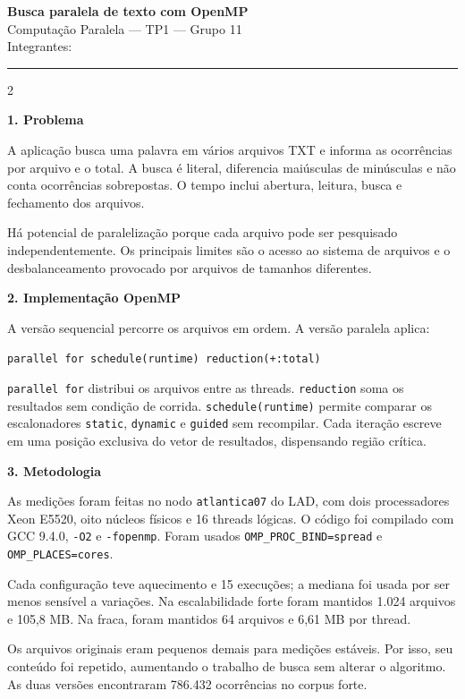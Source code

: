 \documentclass[10pt,a4paper]{article}
\newcommand{\secao}[1]{\vspace{2pt}\textbf{\large #1}\par}
\begin{document}
\begin{center}
  {\Large\textbf{Busca paralela de texto com OpenMP}}\\[-1pt]
  Computação Paralela --- TP1 --- Grupo 11\\
  Integrantes: \rule{10cm}{0.4pt}
\end{center}

\begin{multicols}{2}

\secao{1. Problema}

A aplicação busca uma palavra em vários arquivos TXT e informa as ocorrências
por arquivo e o total. A busca é literal, diferencia maiúsculas de minúsculas e
não conta ocorrências sobrepostas. O tempo inclui abertura, leitura, busca e
fechamento dos arquivos.

Há potencial de paralelização porque cada arquivo pode ser pesquisado
independentemente. Os principais limites são o acesso ao sistema de arquivos e
o desbalanceamento provocado por arquivos de tamanhos diferentes.

\secao{2. Implementação OpenMP}

A versão sequencial percorre os arquivos em ordem. A versão paralela aplica:

\begin{center}
\small\texttt{parallel for schedule(runtime) reduction(+:total)}
\end{center}

\texttt{parallel for} distribui os arquivos entre as threads.
\texttt{reduction} soma os resultados sem condição de corrida.
\texttt{schedule(runtime)} permite comparar os escalonadores \texttt{static},
\texttt{dynamic} e \texttt{guided} sem recompilar. Cada iteração escreve em uma
posição exclusiva do vetor de resultados, dispensando região crítica.

\secao{3. Metodologia}

As medições foram feitas no nodo \texttt{atlantica07} do LAD, com dois
processadores Xeon E5520, oito núcleos físicos e 16 threads lógicas. O código
foi compilado com GCC 9.4.0, \texttt{-O2} e \texttt{-fopenmp}. Foram usados
\texttt{OMP\_PROC\_BIND=spread} e \texttt{OMP\_PLACES=cores}.

Cada configuração teve aquecimento e 15 execuções; a mediana foi usada por ser
menos sensível a variações. Na escalabilidade forte foram mantidos 1.024
arquivos e 105,8 MB. Na fraca, foram mantidos 64 arquivos e 6,61 MB por thread.

Os arquivos originais eram pequenos demais para medições estáveis. Por isso,
seu conteúdo foi repetido, aumentando o trabalho de busca sem alterar o
algoritmo. As duas versões encontraram 786.432 ocorrências no corpus forte.


\end{multicols}
\end{document}
